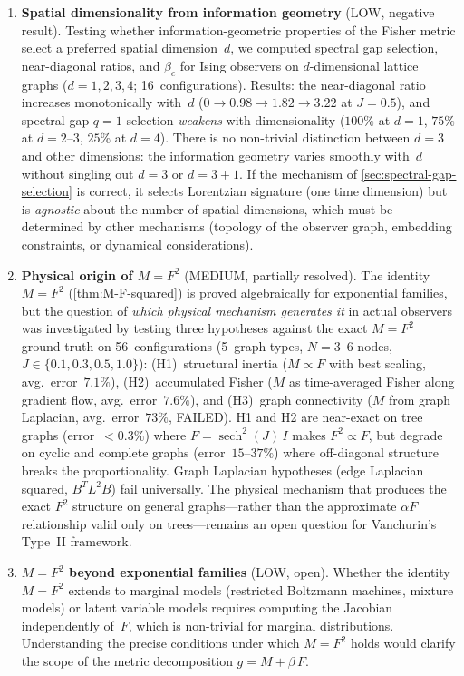 \documentclass[11pt]{article}
\theoremstyle{definition}
\theoremstyle{remark}
\begin{document}
\begin{enumerate}
\item \textbf{Spatial dimensionality from information geometry} (LOW,
  negative result).
  Testing whether information-geometric properties of the Fisher metric
  select a preferred spatial dimension~$d$, we computed spectral gap
  selection, near-diagonal ratios, and $\beta_c$ for Ising observers on
  $d$-dimensional lattice graphs ($d = 1, 2, 3, 4$; 16~configurations).
  Results: the near-diagonal ratio increases monotonically with~$d$
  ($0 \to 0.98 \to 1.82 \to 3.22$ at $J = 0.5$), and spectral gap
  $q = 1$ selection \emph{weakens} with dimensionality ($100\%$ at
  $d = 1$, $75\%$ at $d = 2$--$3$, $25\%$ at $d = 4$).
  There is no non-trivial distinction between $d = 3$ and other
  dimensions: the information geometry varies smoothly with~$d$
  without singling out $d = 3$ or $d = 3 + 1$.
  If the mechanism of \cref{sec:spectral-gap-selection} is correct,
  it selects Lorentzian signature (one time dimension) but is
  \emph{agnostic} about the number of spatial dimensions, which must
  be determined by other mechanisms (topology of the observer graph,
  embedding constraints, or dynamical considerations).

\item \textbf{Physical origin of $M = F^2$} (MEDIUM, partially resolved).
  The identity $M = F^2$ (\cref{thm:M-F-squared}) is proved
  algebraically for exponential families, but the question of
  \emph{which physical mechanism generates it} in actual observers
  was investigated by testing three hypotheses against the exact
  $M = F^2$ ground truth on 56~configurations (5~graph types,
  $N = 3$--$6$ nodes, $J \in \{0.1, 0.3, 0.5, 1.0\}$):
  (H1)~structural inertia ($M \propto F$ with best scaling,
  avg.\ error~$7.1\%$),
  (H2)~accumulated Fisher ($M$ as time-averaged Fisher along
  gradient flow, avg.\ error~$7.6\%$), and
  (H3)~graph connectivity ($M$ from graph Laplacian,
  avg.\ error~$73\%$, FAILED).
  H1 and H2 are near-exact on tree graphs (error~$< 0.3\%$) where
  $F = \operatorname{sech}^2(J)\,I$ makes $F^2 \propto F$,
  but degrade on cyclic and complete graphs (error~$15$--$37\%$)
  where off-diagonal structure breaks the proportionality.
  Graph Laplacian hypotheses (edge Laplacian squared, $B^T L^2 B$)
  fail universally.
  The physical mechanism that produces the exact $F^2$ structure on
  general graphs---rather than the approximate $\alpha F$ relationship
  valid only on trees---remains an open question for Vanchurin's
  Type~II framework.

\item \textbf{$M = F^2$ beyond exponential families} (LOW, open).
  Whether the identity $M = F^2$ extends to marginal models (restricted
  Boltzmann machines, mixture models) or latent variable models
  requires computing the Jacobian independently of~$F$, which is
  non-trivial for marginal distributions.
  Understanding the precise conditions under which $M = F^2$ holds
  would clarify the scope of the metric decomposition
  $g = M + \beta\,F$.
\end{enumerate}
\end{document}
